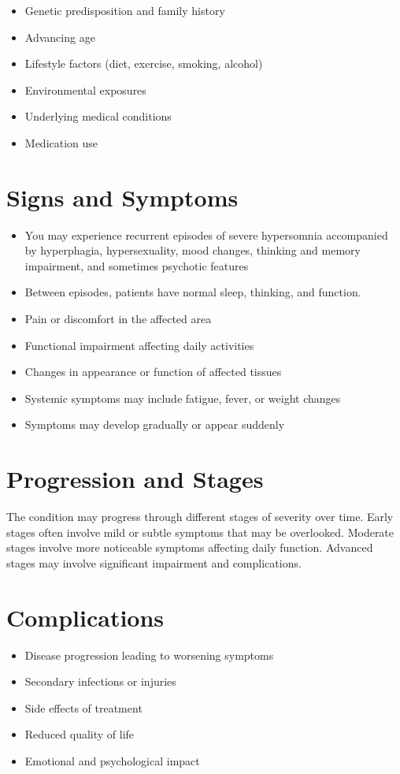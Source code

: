 \begin{itemize}[noitemsep]
  \item Genetic predisposition and family history
  \item Advancing age
  \item Lifestyle factors (diet, exercise, smoking, alcohol)
  \item Environmental exposures
  \item Underlying medical conditions
  \item Medication use
\end{itemize}
\section{Signs and Symptoms}
\begin{itemize}[noitemsep]
  \item You may experience recurrent episodes of severe hypersomnia accompanied by hyperphagia, hypersexuality, mood changes, thinking and memory impairment, and sometimes psychotic features
  \item Between episodes, patients have normal sleep, thinking, and function.
  \item Pain or discomfort in the affected area
  \item Functional impairment affecting daily activities
  \item Changes in appearance or function of affected tissues
  \item Systemic symptoms may include fatigue, fever, or weight changes
  \item Symptoms may develop gradually or appear suddenly
\end{itemize}
\section{Progression and Stages}
The condition may progress through different stages of severity over time. Early stages often involve mild or subtle symptoms that may be overlooked. Moderate stages involve more noticeable symptoms affecting daily function. Advanced stages may involve significant impairment and complications.
\section{Complications}
\begin{itemize}[noitemsep]
  \item Disease progression leading to worsening symptoms
  \item Secondary infections or injuries
  \item Side effects of treatment
  \item Reduced quality of life
  \item Emotional and psychological impact
\end{itemize}
